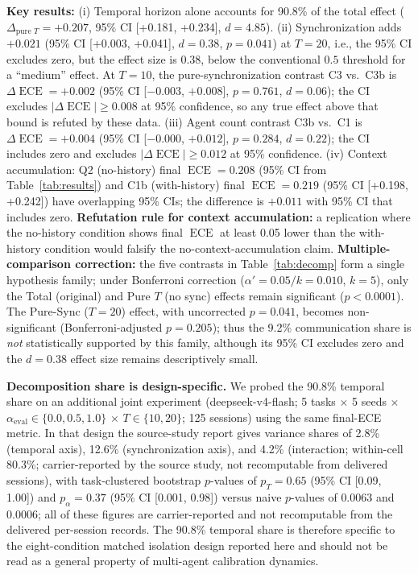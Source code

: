 \documentclass[11pt]{article}
\DeclareMathOperator{\ECE}{ECE}
\begin{document}
\textbf{Key results:} (i) Temporal horizon alone accounts for 90.8\% of the total effect ($\Delta_{\text{pure } T} = +0.207$, 95\% CI [+0.181, +0.234], $d = 4.85$). (ii) Synchronization adds $+0.021$ (95\% CI [+0.003, +0.041], $d = 0.38$, $p = 0.041$) at $T{=}20$, i.e., the 95\% CI excludes zero, but the effect size is $0.38$, below the conventional $0.5$ threshold for a ``medium'' effect. At $T{=}10$, the pure-synchronization contrast C3 vs.\ C3b is $\Delta\ECE = +0.002$ (95\% CI [$-0.003$, $+0.008$], $p = 0.761$, $d = 0.06$); the CI excludes $|\Delta\ECE| \geq 0.008$ at 95\% confidence, so any true effect above that bound is refuted by these data. (iii) Agent count contrast C3b vs.\ C1 is $\Delta\ECE = +0.004$ (95\% CI [$-0.000$, $+0.012$], $p = 0.284$, $d = 0.22$); the CI includes zero and excludes $|\Delta\ECE| \geq 0.012$ at 95\% confidence. (iv) Context accumulation: Q2 (no-history) final $\ECE = 0.208$ (95\% CI from Table~\ref{tab:results}) and C1b (with-history) final $\ECE = 0.219$ (95\% CI [+0.198, +0.242]) have overlapping 95\% CIs; the difference is $+0.011$ with 95\% CI that includes zero. \textbf{Refutation rule for context accumulation:} a replication where the no-history condition shows final $\ECE$ at least 0.05 lower than the with-history condition would falsify the no-context-accumulation claim. \textbf{Multiple-comparison correction:} the five contrasts in Table~\ref{tab:decomp} form a single hypothesis family; under Bonferroni correction ($\alpha' = 0.05/k = 0.010$, $k{=}5$), only the Total (original) and Pure $T$ (no sync) effects remain significant ($p < 0.0001$). The Pure-Sync ($T{=}20$) effect, with uncorrected $p = 0.041$, becomes non-significant (Bonferroni-adjusted $p = 0.205$); thus the 9.2\% communication share is \emph{not} statistically supported by this family, although its 95\% CI excludes zero and the $d = 0.38$ effect size remains descriptively small.

\textbf{Decomposition share is design-specific.} We probed the 90.8\% temporal share on an additional joint experiment (deepseek-v4-flash; 5 tasks $\times$ 5 seeds $\times$ $\alpha_{\mathrm{eval}} \in \{0.0, 0.5, 1.0\}$ $\times$ $T \in \{10, 20\}$; 125 sessions) using the same final-ECE metric. In that design the source-study report gives variance shares of 2.8\% (temporal axis), 12.6\% (synchronization axis), and 4.2\% (interaction; within-cell 80.3\%; carrier-reported by the source study, not recomputable from delivered sessions), with task-clustered bootstrap $p$-values of $p_T = 0.65$ (95\% CI [0.09, 1.00]) and $p_{\alpha} = 0.37$ (95\% CI [0.001, 0.98]) versus naive $p$-values of $0.0063$ and $0.0006$; all of these figures are carrier-reported and not recomputable from the delivered per-session records. The 90.8\% temporal share is therefore specific to the eight-condition matched isolation design reported here and should not be read as a general property of multi-agent calibration dynamics.
\end{document}
